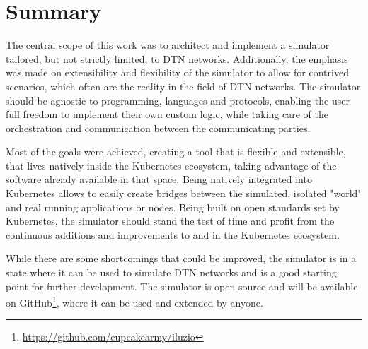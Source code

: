 \chapter{Summary}

The central scope of this work was to architect and implement a simulator tailored, but not strictly limited, to DTN networks. Additionally, the emphasis was made on extensibility and flexibility of the simulator to allow for contrived scenarios, which often are the reality in the field of DTN networks. The simulator should be agnostic to programming, languages and protocols, enabling the user full freedom to implement their own custom logic, while taking care of the orchestration and communication between the communicating parties.

Most of the goals were achieved, creating a tool that is flexible and extensible, that lives natively inside the Kubernetes ecosystem, taking advantage of the software already available in that space. Being natively integrated into Kubernetes allows to easily create bridges between the simulated, isolated "world" and real running applications or nodes. Being built on open standards set by Kubernetes, the simulator should stand the test of time and profit from the continuous additions and improvements to and in the Kubernetes ecosystem.

While there are some shortcomings that could be improved, the simulator is in a state where it can be used to simulate DTN networks and is a good starting point for further development. The simulator is open source and will be available on GitHub\footnote{\url{https://github.com/cupcakearmy/iluzio}}, where it can be used and extended by anyone.
